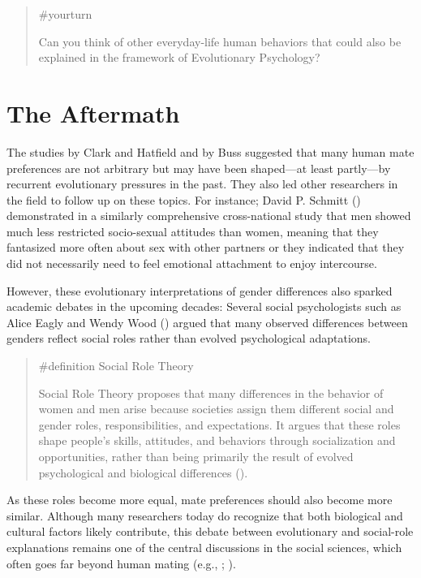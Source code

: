 \documentclass[
  letterpaper,
]{book}
\begin{document}
\begin{quote}
{\#yourturn}

Can you think of other everyday-life human behaviors that could also be
explained in the framework of Evolutionary Psychology?
\end{quote}

\section{The Aftermath}\label{the-aftermath-13}

The studies by Clark and Hatfield and by Buss suggested that many human
mate preferences are not arbitrary but may have been shaped---at least
partly---by recurrent evolutionary pressures in the past. They also led
other researchers in the field to follow up on these topics. For
instance; David P. Schmitt
() demonstrated in a
similarly comprehensive cross-national study that men showed much less
restricted socio-sexual attitudes than women, meaning that they
fantasized more often about sex with other partners or they indicated
that they did not necessarily need to feel emotional attachment to enjoy
intercourse.

However, these evolutionary interpretations of gender differences also
sparked academic debates in the upcoming decades: Several social
psychologists such as Alice Eagly and Wendy Wood
() argued that many observed
differences between genders reflect social roles rather than evolved
psychological adaptations.

\begin{quote}
\label{def-socialroletheory}{\#definition} Social Role
Theory

Social Role Theory proposes that many differences in the behavior of
women and men arise because societies assign them different social and
gender roles, responsibilities, and expectations. It argues that these
roles shape people's skills, attitudes, and behaviors through
socialization and opportunities, rather than being primarily the result
of evolved psychological and biological differences
().
\end{quote}

As these roles become more equal, mate preferences should also become
more similar. Although many researchers today do recognize that both
biological and cultural factors likely contribute, this debate between
evolutionary and social-role explanations remains one of the central
discussions in the social sciences, which often goes far beyond human
mating (e.g., ;
).
\end{document}
